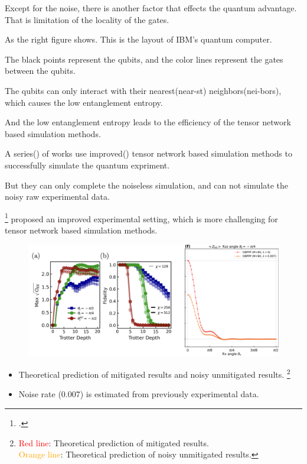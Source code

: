 \documentclass[10pt]{beamer}
\begin{document}
\begin{CJK}{UTF8}{gbsn}
{  Except for the noise, there is another factor that effects the quantum advantage. That is limitation of the locality of the gates.

As the right figure shows. This is the layout of IBM's quantum computer.

The black points represent the qubits, and the color lines represent the gates between the qubits.

The qubits can only interact with their nearest(near-st) neighbors(nei-bors), which causes the low entanglement entropy.

And the low entanglement entropy leads to the efficiency of the tensor network based simulation methods.

 
  A series() of works use improved() tensor network based simulation methods to successfully simulate the quantum expriment.

  But they can only complete the noiseless simulation, and can not simulate the noisy raw experimental data.
 }

\begin{frame}
  \cite{anand2023classical}\footcite{anand2023classical} proposed an improved experimental setting, which is more challenging for tensor network based simulation methods. 
  \begin{figure}
    \centering
    \includegraphics[width=\textwidth]{fig/simibm3.png}
  \end{figure}
  \begin{itemize}
    \item Theoretical prediction of mitigated results and noisy unmitigated results. \footnote{\textcolor{red}{Red line}: Theoretical prediction of mitigated results. \\
    \textcolor{orange}{Orange line}: Theoretical prediction of noisy unmitigated results.}
    \item Noise rate (0.007) is estimated from previously experimental data.
  \end{itemize}
  \vspace{1em}
\end{frame}
\end{CJK}
\end{document}
